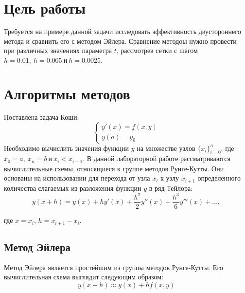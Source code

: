 \section{Цель работы}
Требуется на примере данной задачи исследовать эффективность двустороннего метода и сравнить его с методом Эйлера. Сравнение методоы нужно провести при различных значениях параметра $t$, рассмотрев сетки с шагом $h = 0.01, \: h = 0.005 \: \text{и} \: h = 0.0025$.

\section{Алгоритмы методов}
Поставлена задача Коши:
$$
\begin{cases}
	y'(x) = f(x, y) \\
	y(a) = y_0
\end{cases}
$$
Необходимо вычислить значения функции $y$ на множестве узлов $\{x_i\}_{i = 0}^n$, где $x_0 = a, \: x_n = b \: \text{и} \: x_i < x_{i + 1}.$
В данной лабораторной работе рассматриваются вычислительные схемы, относящиеся к группе методов Рунге-Кутты. Они основаны на использовании для перехода от узла $x_i$ к узлу $x_{i+1}$ определенного количества слагаемых из разложения функции $y$ в ряд Тейлора:
\[
y(x + h) = y(x) + h y'(x) + \frac{h^2}{2} y''(x) + \frac{h^3}{6} y'''(x) + \dots,
\]

где $x = x_i$, $h = x_{i+1} - x_i$.
\subsection{Метод Эйлера}
Метод Эйлера является простейшим из группы методов Рунге-Кутты. Его вычислительная схема выглядит следующим образом:
$$y(x + h) \approx y(x) + h f(x, y)$$
